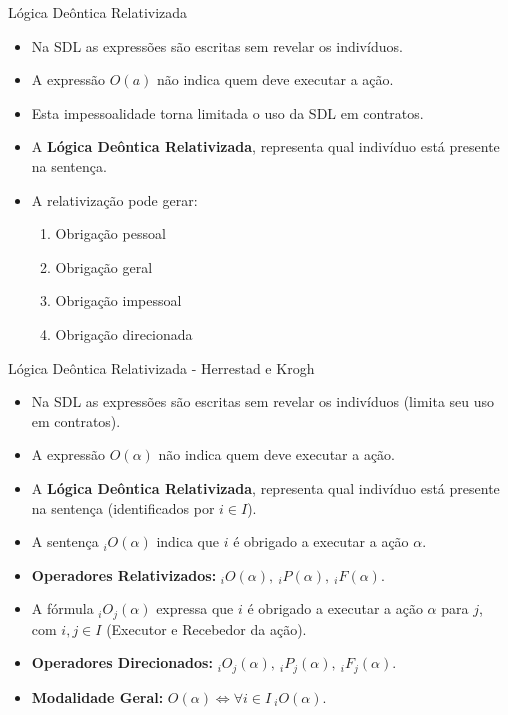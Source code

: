 \begin{frame}{Lógica Deôntica Relativizada}
	\begin{itemize}
		\item Na SDL as expressões são escritas sem revelar os indivíduos.
		\item A expressão $O(a)$ não indica quem deve executar a ação.
		\item Esta impessoalidade torna limitada o uso da SDL em contratos.
		\item A \textbf{Lógica Deôntica Relativizada}, representa qual indivíduo está presente na sentença.
		\item A relativização pode gerar:
		\begin{enumerate}
			\item Obrigação pessoal
			\item Obrigação geral
			\item Obrigação impessoal
			\item Obrigação direcionada
		\end{enumerate}
	\end{itemize}
\end{frame}

\begin{frame}{Lógica Deôntica Relativizada - Herrestad e Krogh}
    \begin{itemize}
        \item Na SDL as expressões são escritas sem revelar os indivíduos (limita seu uso em contratos).
        \item A expressão $O(\alpha)$ não indica quem deve executar a ação.
        \item A \textbf{Lógica Deôntica Relativizada}, representa qual indivíduo está presente na sentença (identificados por $i \in I$).
        \item A sentença $_iO(\alpha)$ indica que $i$ é obrigado a executar a ação $\alpha$.
        \item \textbf{Operadores Relativizados:} $_iO(\alpha), \ _iP(\alpha), \ _iF(\alpha)$.
        \item A fórmula $_iO_j(\alpha)$ expressa que $i$ é obrigado a executar a ação $\alpha$ para $j$, com $i,j \in I$ (Executor e Recebedor da ação).
        \item \textbf{Operadores Direcionados:} $_iO_j(\alpha), \ _iP_j(\alpha), \ _iF_j(\alpha)$.
        \item \textbf{Modalidade Geral:} $O(\alpha) \iff \forall i \in I \ _iO(\alpha)$.
    \end{itemize}
\end{frame}

